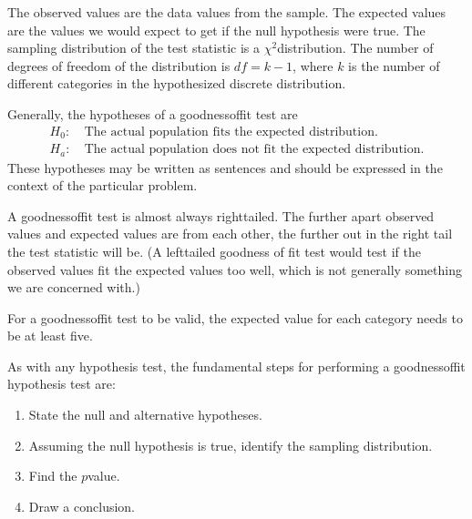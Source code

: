 \documentclass[letterpaper,10pt,english]{jupyterBook}
\begin{document}
\sphinxAtStartPar
The observed values are the data values from the sample. The expected values are the values we would expect to get if the null hypothesis were true. The sampling distribution of the test statistic is a \(\chi^2\)\sphinxhyphen{}distribution. The number of degrees of freedom of the distribution is \(df = k - 1\), where \(k\) is the number of different categories in the hypothesized discrete distribution.

\sphinxAtStartPar
Generally, the hypotheses of a goodness\sphinxhyphen{}of\sphinxhyphen{}fit test are
\begin{align*}
H_0:&\ \text{The actual population fits the expected distribution.} \\
H_a:&\ \text{The actual population does not fit the expected distribution.}
\end{align*}
\sphinxAtStartPar
These hypotheses may be written as sentences and should be expressed in the context of the particular problem.

\sphinxAtStartPar
A goodness\sphinxhyphen{}of\sphinxhyphen{}fit test is almost always right\sphinxhyphen{}tailed. The further apart observed values and expected values are from each other, the further out in the right tail the test statistic will be. (A left\sphinxhyphen{}tailed goodness of fit test would test if the observed values fit the expected values too well, which is not generally something we are concerned with.)

\sphinxAtStartPar
For a goodness\sphinxhyphen{}of\sphinxhyphen{}fit test to be valid, the expected value for each category needs to be at least five.

\sphinxAtStartPar
As with any hypothesis test, the fundamental steps for performing a goodness\sphinxhyphen{}of\sphinxhyphen{}fit hypothesis test are:
\begin{enumerate}
%
\item {} 
\sphinxAtStartPar
State the null and alternative hypotheses.

\item {} 
\sphinxAtStartPar
Assuming the null hypothesis is true, identify the sampling distribution.

\item {} 
\sphinxAtStartPar
Find the \(p\)\sphinxhyphen{}value.

\item {} 
\sphinxAtStartPar
Draw a conclusion.

\end{enumerate}
\end{document}
